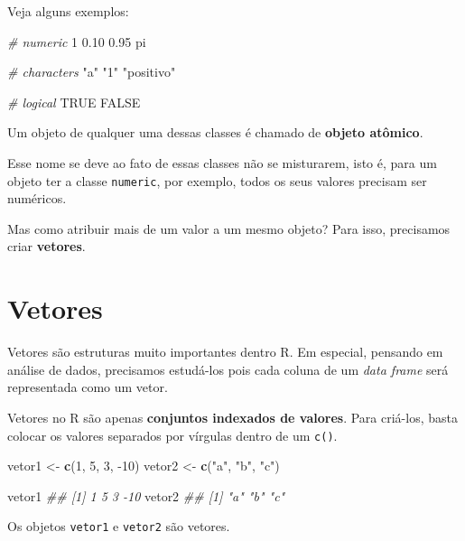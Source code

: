 \documentclass[]{book}
\newenvironment{Shaded}{\begin{snugshade}}{\end{snugshade}}
\newcommand{\CommentTok}[1]{\textcolor[rgb]{0.56,0.35,0.01}{\textit{#1}}}
\newcommand{\DecValTok}[1]{\textcolor[rgb]{0.00,0.00,0.81}{#1}}
\newcommand{\FloatTok}[1]{\textcolor[rgb]{0.00,0.00,0.81}{#1}}
\newcommand{\KeywordTok}[1]{\textcolor[rgb]{0.13,0.29,0.53}{\textbf{#1}}}
\newcommand{\NormalTok}[1]{#1}
\newcommand{\OtherTok}[1]{\textcolor[rgb]{0.56,0.35,0.01}{#1}}
\newcommand{\StringTok}[1]{\textcolor[rgb]{0.31,0.60,0.02}{#1}}
\begin{document}
Veja alguns exemplos:

\begin{Shaded}
\begin{Highlighting}[]
\CommentTok{# numeric}
\DecValTok{1}
\FloatTok{0.10}
\FloatTok{0.95}
\NormalTok{pi}

\CommentTok{# characters}
\StringTok{"a"}
\StringTok{"1"}
\StringTok{"positivo"}

\CommentTok{# logical}
\OtherTok{TRUE}
\OtherTok{FALSE}
\end{Highlighting}
\end{Shaded}

Um objeto de qualquer uma dessas classes é chamado de \textbf{objeto atômico}.

Esse nome se deve ao fato de essas classes não se misturarem, isto é, para um objeto ter a classe \texttt{numeric}, por exemplo, todos os seus valores precisam ser numéricos.

Mas como atribuir mais de um valor a um mesmo objeto? Para isso, precisamos criar \textbf{vetores}.

\hypertarget{vetores}{%
\section{Vetores}\label{vetores}}

Vetores são estruturas muito importantes dentro R. Em especial, pensando em análise de dados, precisamos estudá-los pois cada coluna de um \emph{data frame} será representada como um vetor.

Vetores no R são apenas \textbf{conjuntos indexados de valores}. Para criá-los, basta colocar os valores separados por vírgulas dentro de um \texttt{c()}.

\begin{Shaded}
\begin{Highlighting}[]
\NormalTok{vetor1 <-}\StringTok{ }\KeywordTok{c}\NormalTok{(}\DecValTok{1}\NormalTok{, }\DecValTok{5}\NormalTok{, }\DecValTok{3}\NormalTok{, }\DecValTok{-10}\NormalTok{)}
\NormalTok{vetor2 <-}\StringTok{ }\KeywordTok{c}\NormalTok{(}\StringTok{"a"}\NormalTok{, }\StringTok{"b"}\NormalTok{, }\StringTok{"c"}\NormalTok{)}

\NormalTok{vetor1}
\CommentTok{## [1]   1   5   3 -10}
\NormalTok{vetor2}
\CommentTok{## [1] "a" "b" "c"}
\end{Highlighting}
\end{Shaded}

Os objetos \texttt{vetor1} e \texttt{vetor2} são vetores.
\end{document}
